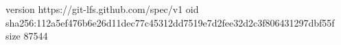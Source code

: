 version https://git-lfs.github.com/spec/v1
oid sha256:112a5ef476b6e26d11dec77c45312dd7519e7d2fee32d2c3f806431297dbf55f
size 87544
